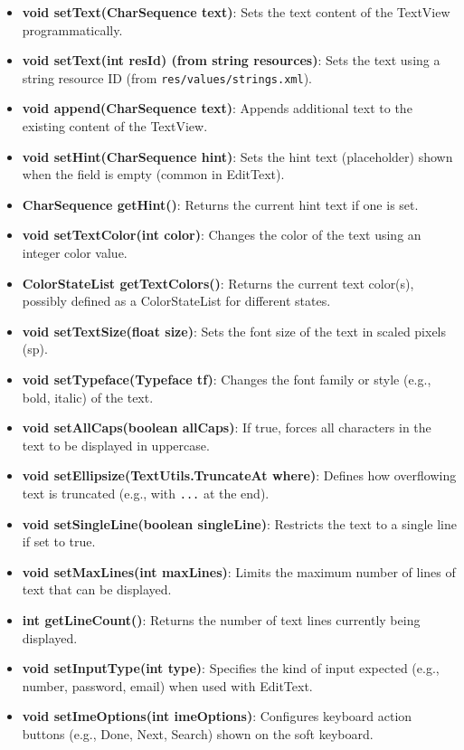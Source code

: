\documentclass{report}
\begin{document}
\begin{itemize}
\begin{itemize}
                \item \textbf{void setText(CharSequence text)}: Sets the text content of the TextView programmatically.
                \item \textbf{void setText(int resId) (from string resources)}: Sets the text using a string resource ID (from \texttt{res/values/strings.xml}).
                \item \textbf{void append(CharSequence text)}: Appends additional text to the existing content of the TextView.
                \item \textbf{void setHint(CharSequence hint)}: Sets the hint text (placeholder) shown when the field is empty (common in EditText).
                \item \textbf{CharSequence getHint()}: Returns the current hint text if one is set.
                \item \textbf{void setTextColor(int color)}: Changes the color of the text using an integer color value.
                \item \textbf{ColorStateList getTextColors()}: Returns the current text color(s), possibly defined as a ColorStateList for different states.
                \item \textbf{void setTextSize(float size)}: Sets the font size of the text in scaled pixels (sp).
                \item \textbf{void setTypeface(Typeface tf)}: Changes the font family or style (e.g., bold, italic) of the text.
                \item \textbf{void setAllCaps(boolean allCaps)}: If true, forces all characters in the text to be displayed in uppercase.
                \item \textbf{void setEllipsize(TextUtils.TruncateAt where)}: Defines how overflowing text is truncated (e.g., with \texttt{...} at the end).
                \item \textbf{void setSingleLine(boolean singleLine)}: Restricts the text to a single line if set to true.
                \item \textbf{void setMaxLines(int maxLines)}: Limits the maximum number of lines of text that can be displayed.
                \item \textbf{int getLineCount()}: Returns the number of text lines currently being displayed.
                \item \textbf{void setInputType(int type)}: Specifies the kind of input expected (e.g., number, password, email) when used with EditText.
                \item \textbf{void setImeOptions(int imeOptions)}: Configures keyboard action buttons (e.g., Done, Next, Search) shown on the soft keyboard.

\end{itemize}
\end{itemize}
\end{document}

